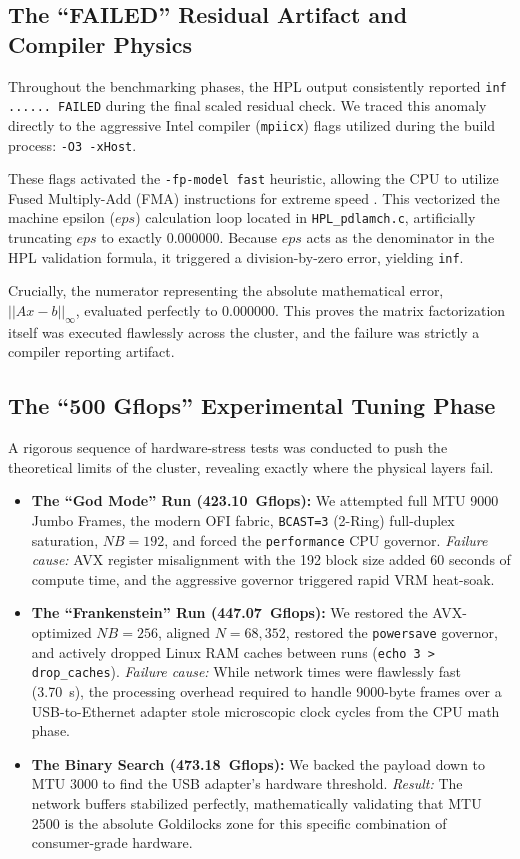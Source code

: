 \documentclass[11pt]{article}
\begin{document}
\subsection{The ``FAILED'' Residual Artifact and Compiler Physics}
Throughout the benchmarking phases, the HPL output consistently reported \texttt{inf ...... FAILED} during the final scaled residual check. We traced this anomaly directly to the aggressive Intel compiler (\texttt{mpiicx}) flags utilized during the build process: \texttt{-O3 -xHost}.

These flags activated the \texttt{-fp-model fast} heuristic, allowing the CPU to utilize Fused Multiply-Add (FMA) instructions for extreme speed . This vectorized the machine epsilon ($eps$) calculation loop located in \texttt{HPL\_pdlamch.c}, artificially truncating $eps$ to exactly $0.000000$. Because $eps$ acts as the denominator in the HPL validation formula, it triggered a division-by-zero error, yielding \texttt{inf}.

Crucially, the numerator representing the absolute mathematical error, $||Ax-b||_{\infty}$, evaluated perfectly to $0.000000$. This proves the matrix factorization itself was executed flawlessly across the cluster, and the failure was strictly a compiler reporting artifact.

\subsection{The ``500 Gflops'' Experimental Tuning Phase}
A rigorous sequence of hardware-stress tests was conducted to push the theoretical limits of the cluster, revealing exactly where the physical layers fail.

\begin{itemize}
  \item \textbf{The ``God Mode'' Run (\SI{423.10}{Gflops}):} We attempted full MTU 9000 Jumbo Frames, the modern OFI fabric, \texttt{BCAST=3} (2-Ring) full-duplex saturation, $NB=192$, and forced the \texttt{performance} CPU governor. \textit{Failure cause:} AVX register misalignment with the 192 block size added 60 seconds of compute time, and the aggressive governor triggered rapid VRM heat-soak.
  \item \textbf{The ``Frankenstein'' Run (\SI{447.07}{Gflops}):} We restored the AVX-optimized $NB=256$, aligned $N=68,352$, restored the \texttt{powersave} governor, and actively dropped Linux RAM caches between runs (\texttt{echo 3 > drop\_caches}). \textit{Failure cause:} While network times were flawlessly fast (\SI{3.70}{\second}), the processing overhead required to handle 9000-byte frames over a USB-to-Ethernet adapter stole microscopic clock cycles from the CPU math phase.
  \item \textbf{The Binary Search (\SI{473.18}{Gflops}):} We backed the payload down to MTU 3000 to find the USB adapter's hardware threshold. \textit{Result:} The network buffers stabilized perfectly, mathematically validating that MTU 2500 is the absolute Goldilocks zone for this specific combination of consumer-grade hardware.
\end{itemize}
\end{document}

